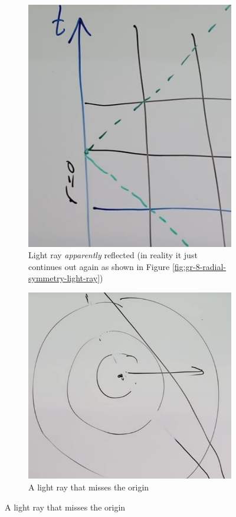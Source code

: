 \documentclass[]{article}
\begin{document}
{\begin{figure}[H]
\begin{center}
\begin{subfigure}[t]{0.3\textwidth}
		\end{subfigure}
		\begin{subfigure}[t]{0.3\textwidth}
			\caption{Light ray \emph{apparently} reflected (in reality it just continues out again as shown in Figure \ref{fig:gr-8-radial-symmetry-light-ray})}\label{fig:gr-8-radial-symmetry-light-ray-bounce}
			\includegraphics[width=\textwidth]{gr-8-radial-symmetry-light-ray-bounce}
		\end{subfigure}
		\begin{subfigure}[t]{0.3\textwidth}
			\caption{A light ray that misses the origin}\label{fig:gr-8-light-ray-missing-origin}
			\includegraphics[width=\textwidth]{gr-8-light-ray-missing-origin}

\end{subfigure}
\end{center}
\end{figure}}
\end{document}
